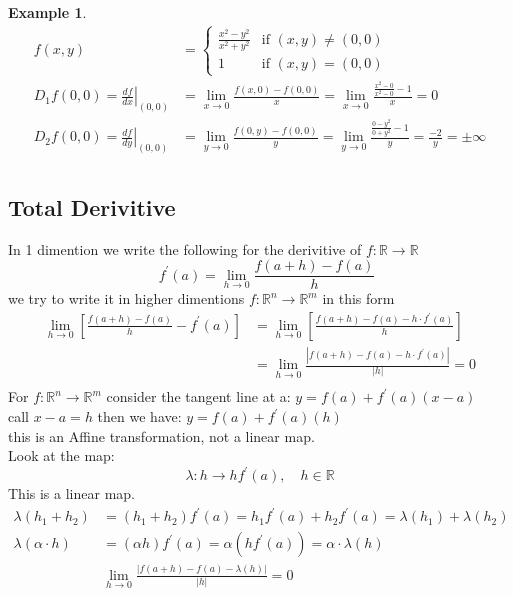 \documentclass[12pt]{article}
\def\RR{\mathbb{R}}
\newtheorem{example}{Example}[section]
\begin{document}
\begin{example}
\begin{align*}
 f(x,y) &=
  \begin{cases}
   \frac{x^{2} - y^{2}}{x^{2} + y^{2}} & \text{if } (x,y) \neq (0,0) \\
   1       & \text{if } (x,y) = (0,0)
  \end{cases}\\
 D_{1}f(0,0) =\left.\frac{df}{dx}\right| _{(0,0)} &=  \lim_{x \to 0}\frac{f(x,0) - f(0,0)}{x}= \lim_{x \to 0}\frac{\frac{x^{2}-0}{x^{2}-0} -1}{x} = 0\\
D_{2}f(0,0) =\left.\frac{df}{dy}\right| _{(0,0)} &=  \lim_{y \to 0}\frac{f(0,y) - f(0,0)}{y}= \lim_{y \to 0}\frac{\frac{0-y^{2}}{0+y^{2}} -1}{y} = \frac{-2}{y}= \pm \infty\\
\end{align*}
\end{example}

\subsection{Total Derivitive}


In 1 dimention we write the following for the derivitive of $f:\RR \rightarrow \RR$
\[\quad f^{'}(a)=\lim_{h \to 0}\frac{f(a+h) - f(a)}{h}\]
we try to write it in higher dimentions $f:\RR^{n} \rightarrow \RR^{m}$ in this form
\begin{align*}
\lim_{h \to 0}\left[\frac{f(a+h) - f(a)}{h} - f^{'}(a)\right] &=\lim_{h \to 0}\left[\frac{f(a+h) - f(a) - h \cdot f^{'}(a)}{h}\right]\\
&=\lim_{h \to 0}\frac{|f(a+h) - f(a) - h \cdot f^{'}(a)|}{|h|} =0 \\
\end{align*}
For $f:\RR^{n} \rightarrow \RR^{m}$ consider the tangent line at a: $y=f(a) +f^{'}(a)(x-a)$\\
call $x-a = h$ then we have: $y=f(a) +f^{'}(a)(h)$\\
this is an Affine transformation, not a linear map.\\
Look at the map:
\[\lambda:h \rightarrow hf^{'}(a), \quad h \in \RR\]
This is a linear map.
\begin{align*}
\lambda(h_{1} + h_{2})&=(h_{1} + h_{2})f^{'}(a)= h_{1}f^{'}(a) + h_{2}f^{'}(a) =\lambda(h_{1}) + \lambda(h_{2})\\
\lambda(\alpha \cdot h)&=(\alpha h)f^{'}(a)=\alpha(hf^{'}(a))=\alpha \cdot\lambda( h)\\
&\lim_{h \to 0}\frac{|f(a+h) - f(a) - \lambda(h)|}{|h|} =0 \\
\end{align*}
\end{document}
